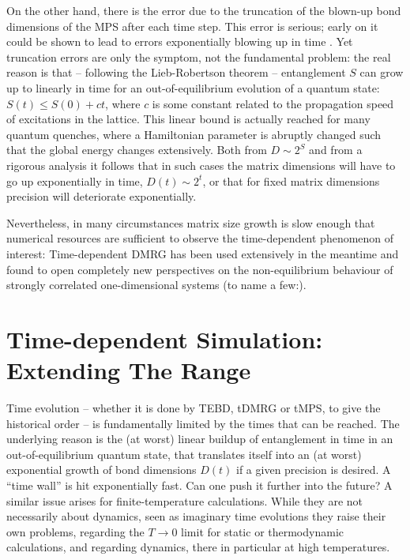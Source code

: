 \documentclass[a4paper,10pt,oneside,onecolumn,1p,times]{elsarticle}
\begin{document}
On the other hand, there is the error due to the truncation of the blown-up bond dimensions of the MPS after each time step. This error is serious; early on it could be shown to lead to errors exponentially blowing up in time \cite{Gobert05}. Yet truncation errors are only the symptom, not the fundamental problem: the real reason is that -- following the Lieb-Robertson theorem -- entanglement $S$ can grow up to linearly in time for an out-of-equilibrium evolution of a quantum state: $S(t) \leq S(0) + c t$, where $c$ is some constant related to the propagation speed of excitations in the lattice\cite{Calabrese06}. This linear bound is actually reached for many quantum quenches, where a Hamiltonian parameter is abruptly changed such that the global energy changes extensively.
Both from $D \sim 2^S$ and from a rigorous analysis \cite{Osborne06} it follows that in such cases the matrix dimensions will have to go up exponentially in time, $D(t) \sim 2^t$, or that for fixed matrix dimensions precision will deteriorate exponentially. 

Nevertheless, in many circumstances matrix size growth is slow enough that numerical resources are sufficient to observe the time-dependent phenomenon of interest: Time-dependent DMRG has been used extensively in the meantime and found to open completely new perspectives on the non-equilibrium behaviour of strongly correlated one-dimensional systems (to name a few:\cite{WhiteFeiguin04,Feiguin05a,Feiguin05,Gobert05,Kollath05,Trebst06,Cramer08,Barthel09a,Kollath06}).
 
\section{Time-dependent Simulation: Extending The Range}
\label{sec:beyondtime}

Time evolution -- whether it is done by TEBD, tDMRG or tMPS, to give the historical order -- is fundamentally limited by the times that can be reached. The underlying reason is the (at worst) linear buildup of entanglement in time in an out-of-equilibrium quantum state, that translates itself into an (at worst) exponential growth of bond dimensions $D(t)$ if a given precision is desired. A ``time wall'' is hit exponentially fast. Can one push it further into the future? A similar issue arises for finite-temperature calculations. While they are not necessarily about dynamics, seen as imaginary time evolutions they raise their own problems, regarding the $T\rightarrow 0$ limit for static or thermodynamic calculations, and regarding dynamics, there in particular at high temperatures.
\end{document}
